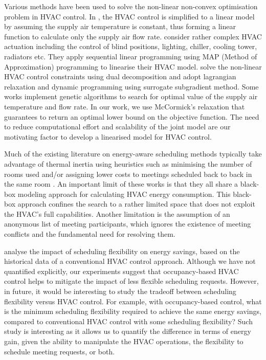 Various methods have been used to solve the non-linear non-convex optimisation problem in HVAC control. In \cite{klein2012coordinating}, the HVAC control is simplified to a linear model by assuming the supply air temperature is constant, thus forming a linear function to calculate only the supply air flow rate. \cite{oldewurtel2013importance} consider rather complex HVAC actuation including the control of blind positions, lighting, chiller, cooling tower, radiators etc. They apply sequential linear programming using MAP (Method of Approximation) programming \citep{griffith1961nonlinear} to linearise their HVAC model. \cite{ma2011distributed} solve the non-linear HVAC control constraints using dual decomposition and \cite{sun2010integrated} adopt lagrangian relaxation and dynamic programming using surrogate subgradient method. Some works \citep{wang2000model, xu2009model, mossolly2009optimal} implement genetic algorithms to search for optimal value of the supply air temperature and flow rate. In our work, we use McCormick's relaxation that guarantees to return an optimal lower bound on the objective function. The need to reduce computational effort and scalability of the joint model are our motivating factor to develop a linearised model for HVAC control. 

Much of the existing literature on energy-aware scheduling methods typically take advantage of thermal inertia using heuristics such as minimising the number of rooms used and/or assigning lower costs to meetings scheduled back to back in the same room \citep{pan2012thermal,kwak2013tesla,majumdar2012energy,chai2014minimizing}. An important limit of these works is that they all share a black-box modeling approach for calculating HVAC energy consumption. This black-box approach confines the search to a rather limited space that does not exploit the HVAC's full capabilities. Another limitation is the assumption of an anonymous list of meeting participants, which ignores the existence of meeting conflicts and the fundamental need for resolving them. 

\cite{kwak2013tesla} analyse the impact of scheduling flexibility on energy savings, based on the historical data of a conventional HVAC control approach. Although we have not quantified explicitly, our experiments suggest that occupancy-based HVAC control helps to mitigate the impact of less flexible scheduling requests. However, in future, it would be interesting to study the tradeoff between scheduling flexibility versus HVAC control. For example, with occupancy-based control, what is the minimum scheduling flexibility required to achieve the same energy savings, compared to conventional HVAC control with some scheduling flexibility? Such study is interesting as it allows us to quantify the difference in terms of energy gain, given the ability to manipulate the HVAC operations, the flexibility to schedule meeting requests, or both.

